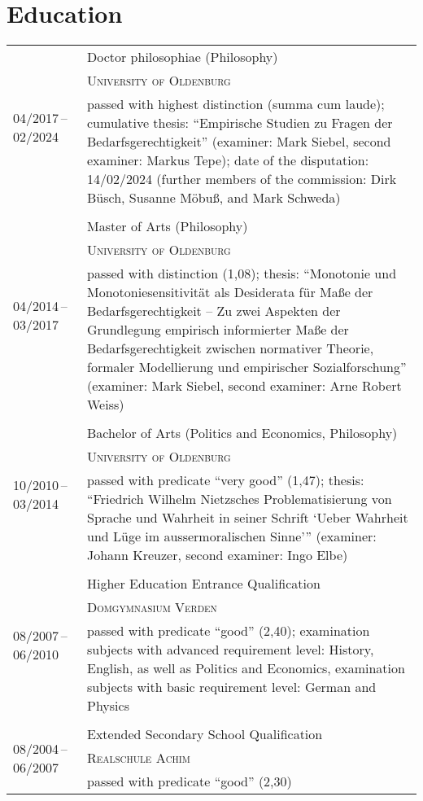 \documentclass[a4paper,10pt]{article}
\begin{document}
\section{Education}
\begin{longtable}{p{2.5cm}p{11cm}}
\multirow{3}{2.5cm}{\footnotesize{04/2017\,--\,02/2024}} & Doctor philosophiae (Philosophy)\\
& \textsc{University of Oldenburg}\\
& \footnotesize{passed with highest distinction (summa cum laude); cumulative thesis: \enquote{Empirische Studien zu Fragen der Bedarfsgerechtigkeit} (examiner: Mark Siebel, second examiner: Markus Tepe); date of the disputation: 14/02/2024 (further members of the commission: Dirk Büsch, Susanne Möbuß, and Mark Schweda)}\\
\\
\multirow{3}{2.5cm}{\footnotesize{04/2014\,--\,03/2017}} & Master of Arts (Philosophy)\\
& \textsc{University of Oldenburg}\\
& \footnotesize{passed with distinction (1,08); thesis: \enquote{Monotonie und Monotoniesensitivität als Desiderata für Maße der Bedarfsgerechtigkeit -- Zu zwei Aspekten der Grundlegung empirisch informierter Maße der Bedarfsgerechtigkeit zwischen normativer Theorie, formaler Modellierung und empirischer Sozialforschung} (examiner: Mark Siebel, second examiner: Arne Robert Weiss)}\\
\\
\multirow{3}{2.5cm}{\footnotesize{10/2010\,--\,03/2014}} & Bachelor of Arts (Politics and Economics, Philosophy)\\
& \textsc{University of Oldenburg}\\
& \footnotesize{passed with predicate \enquote{very good} (1,47); thesis: \enquote{Friedrich Wilhelm Nietzsches Problematisierung von Sprache und Wahrheit in seiner Schrift \enquote{Ueber Wahrheit und Lüge im aussermoralischen Sinne}} (examiner: Johann Kreuzer, second examiner: Ingo Elbe)}\\
\\
\multirow{3}{2.5cm}{\footnotesize{08/2007\,--\,06/2010}} & Higher Education Entrance Qualification\\
& \textsc{Domgymnasium Verden}\\
& \footnotesize{passed with predicate \enquote{good} (2,40); examination subjects with advanced requirement level: History, English, as well as Politics and Economics, examination subjects with basic requirement level: German and Physics}\\
\\
\multirow{3}{2.5cm}{\footnotesize{08/2004\,--\,06/2007}} & Extended Secondary School Qualification\\
& \textsc{Realschule Achim}\\
& \footnotesize{passed with predicate \enquote{good} (2,30)}\\
\end{longtable}
\end{document}
